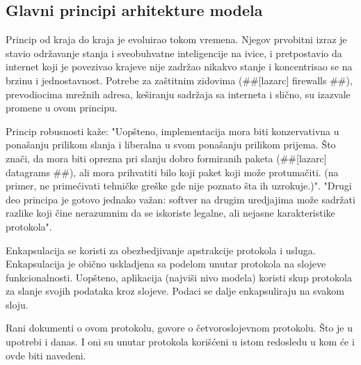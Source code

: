 \documentclass[a4paper,12pt, master]{etf}
\begin{document}
	\subsection{Glavni principi arhitekture modela}

	Princip od kraja do kraja je evoluirao tokom vremena. Njegov prvobitni 
	izraz je stavio	odr\v{z}avanje stanja i sveobuhvatne inteligencije na ivice,
	 i pretpostavio da internet koji je	povezivao krajeve nije zadr\v{z}ao 
	nikakvo stanje i koncentrisao se na brzinu i jednostavnost. Potrebe za 
	za\v{s}titnim zidovima (\#\#[lazarc] firewalls \#\#), prevodiocima 
	mre\v{z}nih adresa,	ke\v{s}iranju sadr\v{z}aja sa interneta i sli\v{c}no, 
	su izazvale promene u ovom principu.

	Princip robusnosti ka\v{z}e: "Uop\v{s}teno, implementacija mora biti 
	konzervativna u pona\v{s}anju prilikom slanja i liberalna u svom 
	pona\v{s}anju prilikom prijema. \v{S}to zna\v{c}i, da mora biti
	oprezna pri slanju dobro formiranih paketa (\#\#[lazarc] datagrams \#\#), 
	ali mora prihvatiti bilo koji paket koji mo\v{z}e protuma\v{c}iti. (na 
	primer, ne prime\'{c}ivati tehni\v{c}ke gre\v{s}ke gde nije poznato \v{s}ta 
	ih uzrokuje.)". "Drugi deo principa je gotovo jednako va\v{z}an: softver na
	drugim uredjajima mo\v{z}e sadr\v{z}ati razlike koji \v{c}ine nerazumnim da 
	se iskoriste legalne, ali nejasne karakteristike protokola".

	Enkapsulacija se koristi za obezbedjivanje apstrakcije protokola i usluga. 
	Enkapsulacija je obi\v{c}no uskladjena sa podelom unutar protokola na 
	slojeve funkcionalnosti. Uop\v{s}teno, aplikacija (najvi\v{s}i nivo modela) 
	koristi skup protokola za slanje svojih podataka kroz slojeve. Podaci se 
	dalje enkapsuliraju na svakom sloju.

	Rani dokumenti o ovom protokolu, govore o \v{c}etvoroslojevnom protokolu. 
	\v{S}to je u upotrebi i	danas. I oni su unutar protokola kori\v{s}\'{c}eni 
	u istom redosledu u kom \'{c}e i ovde biti navedeni.
\end{document}
